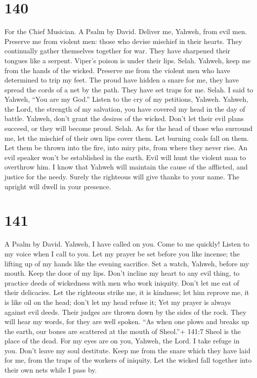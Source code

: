 \hypertarget{section-130}{%
\section{140}\label{section-130}}

For the Chief Musician. A Psalm by David.  Deliver me,
Yahweh, from evil men. Preserve me from violent men:  those
who devise mischief in their hearts. They continually gather themselves
together for war.  They have sharpened their tongues like a
serpent. Viper's poison is under their lips. Selah.  Yahweh,
keep me from the hands of the wicked. Preserve me from the violent men
who have determined to trip my feet.  The proud have hidden
a snare for me, they have spread the cords of a net by the path. They
have set traps for me. Selah.  I said to Yahweh, ``You are
my God.'' Listen to the cry of my petitions, Yahweh. 
Yahweh, the Lord, the strength of my salvation, you have covered my head
in the day of battle.  Yahweh, don't grant the desires of
the wicked. Don't let their evil plans succeed, or they will become
proud. Selah.  As for the head of those who surround me, let
the mischief of their own lips cover them.  Let burning
coals fall on them. Let them be thrown into the fire, into miry pits,
from where they never rise.  An evil speaker won't be
established in the earth. Evil will hunt the violent man to overthrow
him.  I know that Yahweh will maintain the cause of the
afflicted, and justice for the needy.  Surely the righteous
will give thanks to your name. The upright will dwell in your presence.

\hypertarget{section-131}{%
\section{141}\label{section-131}}

A Psalm by David.  Yahweh, I have called on you. Come to me
quickly! Listen to my voice when I call to you.  Let my
prayer be set before you like incense; the lifting up of my hands like
the evening sacrifice.  Set a watch, Yahweh, before my
mouth. Keep the door of my lips.  Don't incline my heart to
any evil thing, to practice deeds of wickedness with men who work
iniquity. Don't let me eat of their delicacies.  Let the
righteous strike me, it is kindness; let him reprove me, it is like oil
on the head; don't let my head refuse it; Yet my prayer is always
against evil deeds.  Their judges are thrown down by the
sides of the rock. They will hear my words, for they are well spoken.
 ``As when one plows and breaks up the earth, our bones are
scattered at the mouth of Sheol.''+ 141:7 Sheol is the place of the
dead.  For my eyes are on you, Yahweh, the Lord. I take
refuge in you. Don't leave my soul destitute.  Keep me from
the snare which they have laid for me, from the traps of the workers of
iniquity.  Let the wicked fall together into their own nets
while I pass by.

